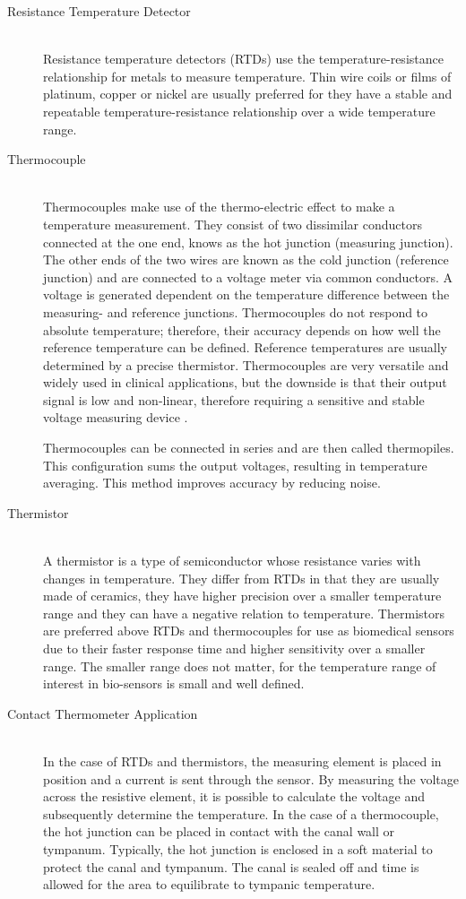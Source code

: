 \begin{description}
\item[Resistance Temperature Detector] \hfill \\Resistance temperature detectors (RTDs) use the temperature-resistance relationship for metals to measure temperature. Thin wire coils or films of platinum, copper or nickel are usually preferred for they have a stable and repeatable temperature-resistance relationship over a wide temperature range.

\item[Thermocouple] \hfill \\
Thermocouples make use of the thermo-electric effect to make a temperature measurement. They consist of two dissimilar conductors connected at the one end, knows as the hot junction (measuring junction). The other ends of the two wires are known as the cold junction (reference junction) and are connected to a voltage meter via common conductors. A voltage is generated dependent on the temperature difference between the measuring- and reference junctions. Thermocouples do not respond to absolute temperature; therefore, their accuracy depends on how well the reference temperature can be defined. Reference temperatures are usually determined by a precise thermistor. Thermocouples are very versatile and widely used in clinical applications, but the downside is that their output signal is low and non-linear, therefore requiring a sensitive and stable voltage measuring device \citep{jones2010biomedical}.

\medskip
Thermocouples can be connected in series and are then called thermopiles. This configuration sums the output voltages, resulting in temperature averaging. This method improves accuracy by reducing noise. 

\item[Thermistor] \hfill \\
A thermistor is a type of semiconductor whose resistance varies with changes in temperature. They differ from RTDs in that they are usually made of ceramics, they have higher precision over a smaller temperature range and they can have a negative relation to temperature. Thermistors are preferred above RTDs and thermocouples for use as biomedical sensors due to their faster response time and higher sensitivity over a smaller range. The smaller range does not matter, for the temperature range of interest in bio-sensors is small and well defined.

\item[Contact Thermometer Application] \hfill \\
In the case of RTDs and thermistors, the measuring element is placed in position and a current is sent through the sensor. By measuring the voltage across the resistive element, it is possible to calculate the voltage and subsequently determine the temperature. In the case of a thermocouple, the hot junction can be placed in contact with the canal wall or tympanum. Typically, the hot junction is enclosed in a soft material to protect the canal and tympanum. The canal is sealed off and time is allowed for the area to equilibrate to tympanic temperature.


\end{description}
